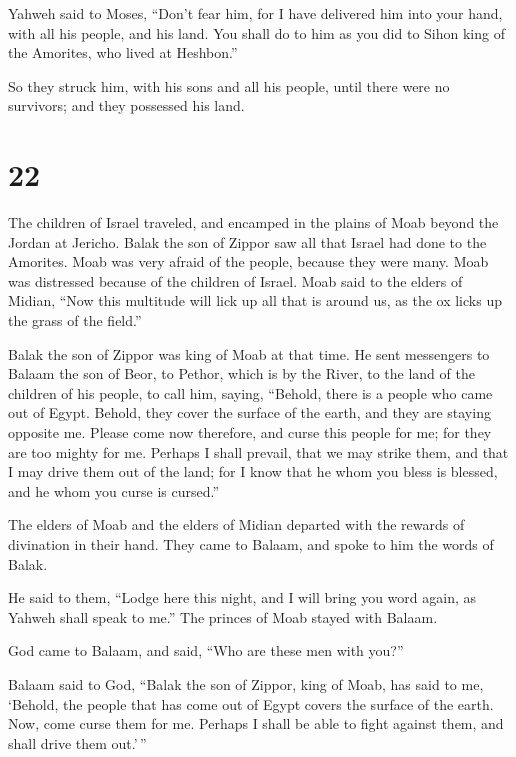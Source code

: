  Yahweh said to Moses, ``Don't fear him, for I have
delivered him into your hand, with all his people, and his land. You
shall do to him as you did to Sihon king of the Amorites, who lived at
Heshbon.''

 So they struck him, with his sons and all his people,
until there were no survivors; and they possessed his land.

\hypertarget{section-21}{%
\section{22}\label{section-21}}

 The children of Israel traveled, and encamped in the
plains of Moab beyond the Jordan at Jericho.  Balak the
son of Zippor saw all that Israel had done to the Amorites.
 Moab was very afraid of the people, because they were
many. Moab was distressed because of the children of Israel.
 Moab said to the elders of Midian, ``Now this multitude
will lick up all that is around us, as the ox licks up the grass of the
field.''

Balak the son of Zippor was king of Moab at that time.  He
sent messengers to Balaam the son of Beor, to Pethor, which is by the
River, to the land of the children of his people, to call him, saying,
``Behold, there is a people who came out of Egypt. Behold, they cover
the surface of the earth, and they are staying opposite me.
 Please come now therefore, and curse this people for me;
for they are too mighty for me. Perhaps I shall prevail, that we may
strike them, and that I may drive them out of the land; for I know that
he whom you bless is blessed, and he whom you curse is cursed.''

 The elders of Moab and the elders of Midian departed with
the rewards of divination in their hand. They came to Balaam, and spoke
to him the words of Balak.

 He said to them, ``Lodge here this night, and I will
bring you word again, as Yahweh shall speak to me.'' The princes of Moab
stayed with Balaam.

 God came to Balaam, and said, ``Who are these men with
you?''

 Balaam said to God, ``Balak the son of Zippor, king of
Moab, has said to me,  `Behold, the people that has come
out of Egypt covers the surface of the earth. Now, come curse them for
me. Perhaps I shall be able to fight against them, and shall drive them
out.'\,''

